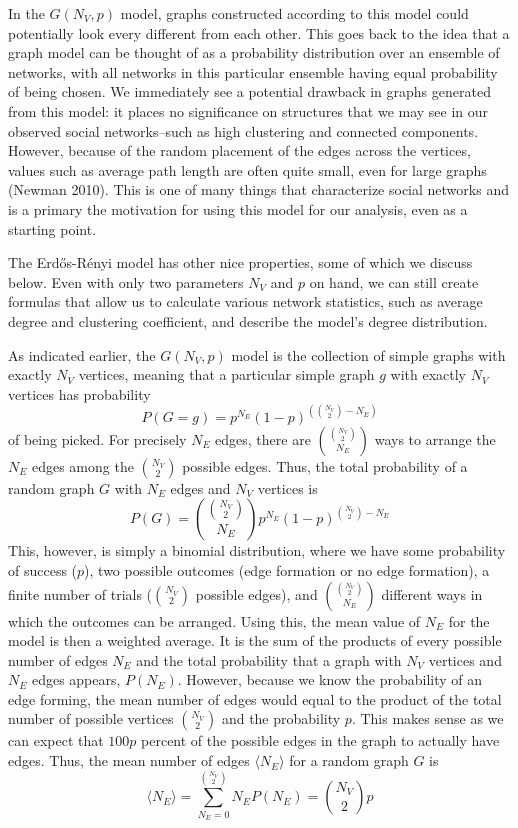 \documentclass[12pt,twoside]{amherstthesis}
\begin{document}
  In the \(G(N_{V}, p)\) model, graphs constructed according to this model
  could potentially look every different from each other. This goes back
  to the idea that a graph model can be thought of as a probability
  distribution over an ensemble of networks, with all networks in this
  particular ensemble having equal probability of being chosen. We
  immediately see a potential drawback in graphs generated from this
  model: it places no significance on structures that we may see in our
  observed social networks--such as high clustering and connected
  components. However, because of the random placement of the edges across
  the vertices, values such as average path length are often quite small,
  even for large graphs (Newman 2010). This is one of many things that
  characterize social networks and is a primary the motivation for using
  this model for our analysis, even as a starting point.
  
  The Erdős-Rényi model has other nice properties, some of which we
  discuss below. Even with only two parameters \(N_{V}\) and \(p\) on
  hand, we can still create formulas that allow us to calculate various
  network statistics, such as average degree and clustering coefficient,
  and describe the model's degree distribution.
  
  As indicated earlier, the \(G(N_{V}, p)\) model is the collection of
  simple graphs with exactly \(N_{V}\) vertices, meaning that a particular
  simple graph \(g\) with exactly \(N_{V}\) vertices has probability
  \[P(G = g) = p^{N_{E}}(1 - p)^{\left({N_{V} \choose 2} - N_{E} \right)}\]
  of being picked. For precisely \(N_E\) edges, there are
  \({{N_{V} \choose 2} \choose N_{E}}\) ways to arrange the \(N_{E}\)
  edges among the \({N_V \choose 2}\) possible edges. Thus, the total
  probability of a random graph \(G\) with \(N_{E}\) edges and \(N_{V}\)
  vertices is
  \[P(G) = {{N_{V} \choose 2} \choose N_{E}}p^{N_E}(1 - p)^{{N_V \choose 2} - N_E}\]
  This, however, is simply a binomial distribution, where we have some
  probability of success (\(p\)), two possible outcomes (edge formation or
  no edge formation), a finite number of trials (\({N_{V} \choose 2}\)
  possible edges), and \({{N_{V} \choose 2} \choose N_{E}}\) different
  ways in which the outcomes can be arranged. Using this, the mean value
  of \(N_{E}\) for the model is then a weighted average. It is the sum of
  the products of every possible number of edges \(N_{E}\) and the total
  probability that a graph with \(N_{V}\) vertices and \(N_{E}\) edges
  appears, \(P(N_{E})\). However, because we know the probability of an
  edge forming, the mean number of edges would equal to the product of the
  total number of possible vertices \({N_{V} \choose 2}\) and the
  probability \(p\). This makes sense as we can expect that \(100p\)
  percent of the possible edges in the graph to actually have edges. Thus,
  the mean number of edges \(\langle N_{E} \rangle\) for a random graph
  \(G\) is
  \[ \langle N_{E} \rangle = \sum_{N_{E}=0}^{{N_{V} \choose 2}} N_{E}P(N_{E}) = {N_{V} \choose 2}p\]
  
\end{document}
